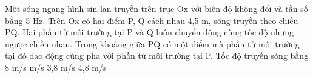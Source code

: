 \begin{vidu}%
Một sóng ngang hình sin lan truyền trên trục Ox với biên độ không đổi và tần số bằng 5 Hz. Trên Ox có hai điểm P, Q cách nhau 4,5 m, sóng truyền theo chiều PQ. Hai phần tử môi trường tại P và Q luôn chuyển động cùng tốc độ nhưng ngược chiều nhau. Trong khoảng giữa PQ có một điểm mà phần tử môi trường tại đó dao động cùng pha với phần tử môi trường tại P. Tốc độ truyền sóng bằng
\choice
{8 m/s}
{ m/s}
{3,8 m/s}
{4,8 m/s}
\end{vidu} 






















